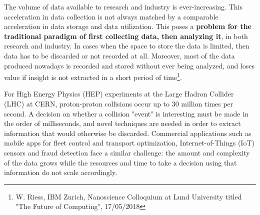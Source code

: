 \vspace{-2mm}

The volume of data available to research and industry is ever-increasing. 
This acceleration in data collection is not always matched by a comparable acceleration in data storage and data utilization. 
This poses a \textbf{problem for the traditional paradigm of first collecting data, then analyzing it}, in both research and industry. In cases when the space to store the data is limited, then data has to be discarded or not recorded at all. 
Moreover, most of the data produced nowadays is recorded and stored without ever being analyzed, and loses value if insight is not extracted in a short period of time\footnote{W. Riess, IBM Zurich, Nanoscience Colloquium at Lund University titled "The Future of Computing", 17/05/2018}.

For High Energy Physics (HEP) experiments at the Large Hadron Collider (LHC) at CERN, proton-proton collisions occur up to 30 million times per second. A decision on whether a collision "event" is interesting must be made in the order of milliseconds, and novel techniques are needed in order to extract information that would otherwise be discarded. Commercial applications such as mobile apps for fleet control and transport optimization, Internet-of-Things (IoT) sensors and fraud detection face a similar challenge: the amount and complexity of the data grows while the resources and time to take a decision using that information do not scale accordingly.

 

